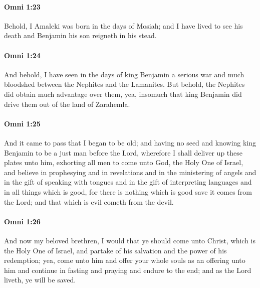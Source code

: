 		\paragraph{Omni 1:23} %
			\label{OMNI-1-23}

			Behold, I Amaleki was born in the days of Mosiah;
			and I have lived to see his death and Benjamin his son reigneth in his stead.

		\paragraph{Omni 1:24} %
			\label{OMNI-1-24}

			And behold, I have seen in the days of king Benjamin
			a serious war and much bloodshed between the Nephites and the Lamanites.
			But behold, the Nephites did obtain much advantage over them,
			yea, insomuch that king Benjamin did drive them out of the land of Zarahemla.

		\paragraph{Omni 1:25} %
			\label{OMNI-1-25}

			And it came to pass that I began to be old;
			and having no seed
			and knowing king Benjamin to be a just man before the Lord,
			wherefore I shall deliver up these plates unto him,
			exhorting all men to come unto God, the Holy One of Israel,
			and believe in prophesying and in revelations
			and in the ministering of angels
			and in the gift of speaking with tongues
			and in the gift of interpreting languages
			and in all things which is good,
			for there is nothing which is good save it comes from the Lord;
			and that which is evil cometh from the devil.

		\paragraph{Omni 1:26} %
			\label{OMNI-1-26}

			And now my beloved brethren,
			I would that ye should come unto Christ, which is the Holy One of Israel,
			and partake of his salvation and the power of his redemption;
			yea, come unto him and offer your whole souls as an offering unto him
			and continue in fasting and praying and endure to the end;
			and as the Lord liveth, ye will be saved.

